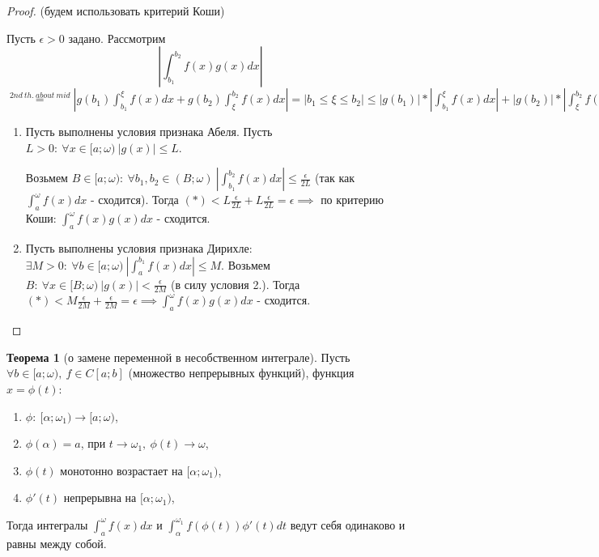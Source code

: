 \documentclass{report}
\theoremstyle{definition}
\newtheorem{theorem}{Теорема}[section]
\begin{document}
\begin{proof}
  (будем использовать критерий Коши)

  Пусть $\epsilon > 0 $ задано. Рассмотрим
  \begin{equation*}
    | \int_{b_1}^{b_2}f(x)g(x)dx |
  \end{equation*}
  $\overset{2nd \ th. \ about \ mid}{=} |g(b_1)\int_{b_1}^{\xi}f(x)dx + g(b_2)\int_{\xi}^{b_2}f(x)dx| =
    | b_1 \leqslant \xi \leqslant b_2 | \leqslant | g(b_1) | * | \int_{b_1}^{\xi} f(x)dx | + | g(b_2) | *
    | \int_{\xi}^{b_2}f(x)dx | \ (*)$
  \begin{enumerate}
    \item Пусть выполнены условия признака Абеля. Пусть $L > 0: \ \forall x \in [a;\omega) \ | g(x) |
            \leqslant L$.

          Возьмем $B \in [a;\omega): \ \forall b_1,b_2 \in (B;\omega) \ | \int_{b_1}^{b_2}f(x)dx | \leqslant
            \frac{\epsilon}{2L}$ (так как $\int_{a}^{\omega}f(x)dx$ - сходится). Тогда $(*) < L\frac{\epsilon}{2L}
            + L\frac{\epsilon}{2L} = \epsilon \implies$ по критерию Коши: $\int_{a}^{\omega}f(x)g(x)dx$ - сходится.

    \item Пусть выполнены условия признака Дирихле: $\exists M > 0: \ \forall b \in [a;\omega) \
            | \int_{a}^{b_1}f(x)dx | \leqslant M$. Возьмем $B: \ \forall x \in [B;\omega) \ | g(x) | < \frac{\epsilon}
            {2M}$ (в силу условия 2.). Тогда $(*) < M\frac{\epsilon}{2M} + \frac{\epsilon}{2M} = \epsilon \implies
            \int_{a}^{\omega}f(x)g(x)dx$ - сходится.
  \end{enumerate}
\end{proof}

\begin{theorem}[о замене переменной в несобственном интеграле]
  Пусть $\forall b \in [a;\omega), \ f \in C[a;b]$ (множество непрерывных функций), функция $x = \phi(t):$
  \begin{enumerate}
    \item $\phi: \ [\alpha;\omega_1) \rightarrow [a;\omega)$,
    \item $\phi(\alpha) = a$, при $t \rightarrow \omega_1, \ \phi(t) \rightarrow \omega$,
    \item $\phi(t)$ монотонно возрастает на $[\alpha;\omega_1)$,
    \item $\phi'(t)$ непрерывна на $[\alpha;\omega_1)$,
  \end{enumerate}
  Тогда интегралы $\int_{a}^{\omega}f(x)dx$ и $\int_{\alpha}^{\omega_1}f(\phi(t))\phi'(t)dt$ ведут себя
  одинаково и равны между собой.
\end{theorem}
\end{document}
